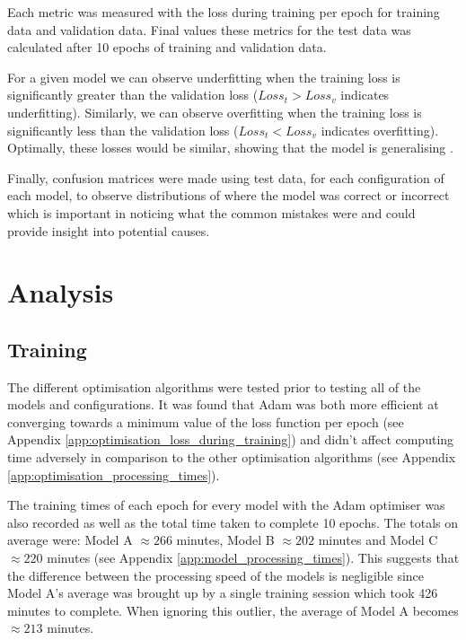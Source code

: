 \documentclass[12pt]{article}
\begin{document}
    Each metric was measured with the loss during training per epoch for training data and validation data. Final values these metrics for the test data was calculated after 10 epochs of training and validation data.\medskip
    
    For a given model we can observe underfitting when the training loss is significantly greater than the validation loss ($Loss_t > Loss_v$ indicates underfitting). Similarly, we can observe overfitting when the training loss is significantly less than the validation loss ($Loss_t < Loss_v$ indicates overfitting). Optimally, these losses would be similar, showing that the model is generalising \parencite{Stallard}.\medskip
    
    Finally, confusion matrices were made using test data, for each configuration of each model, to observe distributions of where the model was correct or incorrect which is important in noticing what the common mistakes were and could provide insight into potential causes.
    
    \newpage
	\section{Analysis}
	
	\subsection{Training}
	\label{sec:training_analysis}
	
    The different optimisation algorithms were tested prior to testing all of the models and configurations. It was found that Adam was both more efficient at converging towards a minimum value of the loss function per epoch (see Appendix \ref{app:optimisation_loss_during_training}) and didn't affect computing time adversely in comparison to the other optimisation algorithms (see Appendix \ref{app:optimisation_processing_times}).\medskip
    
    The training times of each epoch for every model with the Adam optimiser was also recorded as well as the total time taken to complete 10 epochs. The totals on average were: Model A $\approx 266$ minutes, Model B $\approx 202$ minutes and Model C $\approx 220$ minutes (see Appendix \ref{app:model_processing_times}). This suggests that the difference between the processing speed of the models is negligible since Model A's average was brought up by a single training session which took 426 minutes to complete. When ignoring this outlier, the average of Model A becomes $\approx 213$ minutes.\medskip
    
\end{document}
